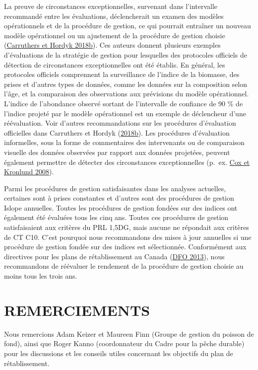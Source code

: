 \documentclass[french,11pt]{book}
\begin{document}
La preuve de circonstances exceptionnelles, survenant dans l'intervalle recommandé entre les évaluations, déclencherait un examen des modèles opérationnels et de la procédure de gestion, ce qui pourrait entraîner un nouveau modèle opérationnel ou un ajustement de la procédure de gestion choisie (\protect\hyperlink{ref-carruthers_hordyk_2018}{Carruthers et Hordyk 2018b}). Ces auteurs donnent plusieurs exemples d'évaluations de la stratégie de gestion pour lesquelles des protocoles officiels de détection de circonstances exceptionnelles ont été établis. En général, les protocoles officiels comprennent la surveillance de l'indice de la biomasse, des prises et d'autres types de données, comme les données sur la composition selon l'âge, et la comparaison des observations aux prévisions du modèle opérationnel. L'indice de l'abondance observé sortant de l'intervalle de confiance de 90 \% de l'indice projeté par le modèle opérationnel est un exemple de déclencheur d'une réévaluation. Voir d'autres recommandations sur les procédures d'évaluation officielles dans Carruthers et Hordyk (\protect\hyperlink{ref-carruthers_hordyk_2018}{2018b}). Les procédures d'évaluation informelles, sous la forme de commentaires des intervenants ou de comparaison visuelle des données observées par rapport aux données projetées, peuvent également permettre de détecter des circonstances exceptionnelles (p.~ex. \protect\hyperlink{ref-cox2008a}{Cox et Kronlund 2008}).

Parmi les procédures de gestion satisfaisantes dans les analyses actuelles, certaines sont à prises constantes et d'autres sont des procédures de gestion Islope annuelles. Toutes les procédures de gestion fondées sur des indices ont également été évaluées tous les cinq ans. Toutes ces procédures de gestion satisfaisaient aux critères du PRL 1,5DG, mais aucune ne répondait aux critères de CT C10. C'est pourquoi nous recommandons des mises à jour annuelles si une procédure de gestion fondée sur des indices est sélectionnée. Conformément aux directives pour les plans de rétablissement au Canada (\protect\hyperlink{ref-dfo2013}{DFO 2013}), nous recommandons de réévaluer le rendement de la procédure de gestion choisie au moins tous les trois ans.

\hypertarget{remerciements}{%
\section{REMERCIEMENTS}\label{remerciements}}

Nous remercions Adam Keizer et Maureen Finn (Groupe de gestion du poisson de fond), ainsi que Roger Kanno (coordonnateur du Cadre pour la pêche durable) pour les discussions et les conseils utiles concernant les objectifs du plan de rétablissement.
\end{document}
